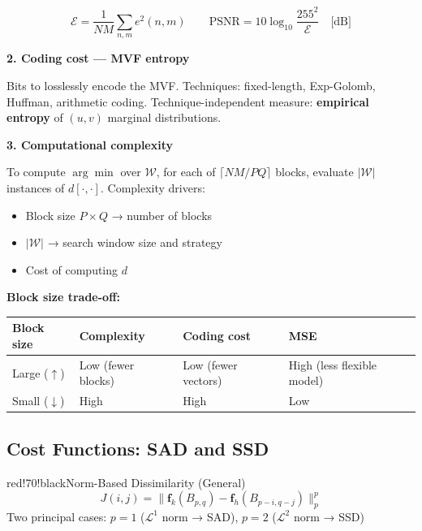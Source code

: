 \[
\mathcal{E} = \frac{1}{NM}\sum_{n,m} e^2(n,m) \qquad \text{PSNR} = 10\log_{10}\frac{255^2}{\mathcal{E}} \quad \text{[dB]}
\]

\textbf{2. Coding cost — MVF entropy}

Bits to losslessly encode the MVF. Techniques: fixed-length, Exp-Golomb, Huffman, arithmetic coding. Technique-independent measure: \textbf{empirical entropy} of $(u,v)$ marginal distributions.

\textbf{3. Computational complexity}

To compute $\arg\min$ over $\mathcal{W}$, for each of $\lceil NM/PQ \rceil$ blocks, evaluate $|\mathcal{W}|$ instances of $d[\cdot,\cdot]$. Complexity drivers:
\begin{itemize}
\item Block size $P \times Q$ → number of blocks
\item $|\mathcal{W}|$ → search window size and strategy
\item Cost of computing $d$
\end{itemize}

\textbf{Block size trade-off:}

\begin{center}
\begin{tabular}{|l|l|l|l|}
\hline
\textbf{Block size} & \textbf{Complexity} & \textbf{Coding cost} & \textbf{MSE} \\ \hline
Large ($\uparrow$) & Low (fewer blocks) & Low (fewer vectors) & High (less flexible model) \\ \hline
Small ($\downarrow$) & High & High & Low \\ \hline
\end{tabular}
\end{center}

\begin{center}\end{center}

\subsection{Cost Functions: SAD and SSD}

\begin{calloutbox}{red!70!black}{Norm-Based Dissimilarity (General)}
\[
J(i,j) = \|\mathbf{f}_k(B_{p,q}) - \mathbf{f}_h(B_{p-i,q-j})\|_p^p \tag{2}
\]
Two principal cases: $p=1$ ($\mathcal{L}^1$ norm → SAD), $p=2$ ($\mathcal{L}^2$ norm → SSD)
\end{calloutbox}

